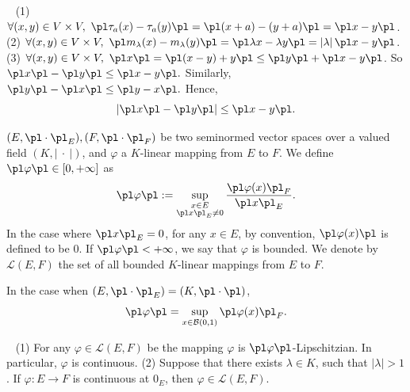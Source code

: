 \begin{proofenv}
    \ \newline
    (1) $\forall(x,y)\in V\times V,\ \pl \tau_a(x)-\tau_a(y)\pl=\pl(x+a)-(y+a)\pl=\pl x-y\pl$.
    \newline
    (2) $\forall (x,y)\in V\times V,\ \pl m_\lambda(x)-m_\lambda(y)\pl=\pl\lambda x-\lambda y\pl=\left|\lambda\right|\pl x-y\pl $.
    \newline
    (3) $\forall (x,y)\in V\times V,\ \pl x\pl =\pl (x-y)+y\pl\le\pl y\pl+\pl x-y\pl$. So $\pl x\pl -\pl y\pl \le \pl x-y\pl.$ Similarly, $\pl y\pl -\pl x\pl \le \pl y-x\pl.$ Hence,
    $$\left|\pl x\pl-\pl y\pl\right|\le \pl x-y\pl.$$
\end{proofenv}
\begin{definitionenv}
    $(E,\pl\cdot\pl_E),(F,\pl\cdot\pl_F)$ be two seminormed vector spaces over a valued field $(K,\left|\ \cdot\ \right|)$, and $\varphi$ a $K$-linear mapping from $E$ to $F$. We define $\pl\varphi\pl\in \left[0,+\infty\right]$  as
    $$\pl\varphi\pl:=\sup_{\substack{x\in E\\ \pl x\pl_E\neq 0}}\frac{\pl\varphi(x)\pl_F}{\pl x\pl_E}.$$
    In the case where $\pl x\pl_E=0$, for any $x\in E$, by convention, $\pl\varphi(x)\pl$ is defined to be $0$. If $\pl \varphi\pl<+\infty$, we say that $\varphi$ is bounded. We denote by $\mathscr{L}(E,F)$ the set of all bounded $K$-linear mappings from $E$ to $F$.
\end{definitionenv}
\begin{remark}
    In the case when $(E,\pl \cdot\pl_E)=(K,\pl\cdot\pl) $, 
    $$\pl\varphi\pl=\sup_{x\in\mathcal{B}(0,1)}\pl\varphi(x)\pl_{F}.$$
\end{remark}
\begin{propositionenv}
    \ \newline
    (1) For any $\varphi\in\mathscr{L}(E,F)$ be the mapping $\varphi$ is $\pl\varphi\pl$-Lipschitzian. In particular, $\varphi$ is continuous.
    \newline
    (2) Suppose that there exists $\lambda\in K$, such that $|\lambda|>1$. If $\varphi: E\longrightarrow F$  is continuous at $0_E$, then $\varphi\in \mathscr{L}(E,F)$.
\end{propositionenv}
